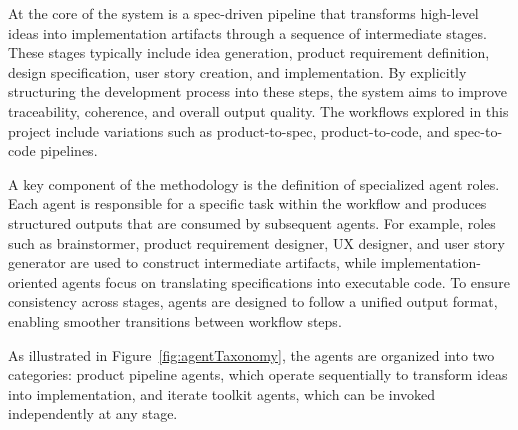 \documentclass[a4paper,12pt]{report}
\begin{document}
At the core of the system is a spec-driven pipeline that transforms high-level ideas into implementation artifacts through a sequence of intermediate stages. These stages typically include idea generation, product requirement definition, design specification, user story creation, and implementation. By explicitly structuring the development process into these steps, the system aims to improve traceability, coherence, and overall output quality. The workflows explored in this project include variations such as product-to-spec, product-to-code, and spec-to-code pipelines.

A key component of the methodology is the definition of specialized agent roles. Each agent is responsible for a specific task within the workflow and produces structured outputs that are consumed by subsequent agents. For example, roles such as brainstormer, product requirement designer, UX designer, and user story generator are used to construct intermediate artifacts, while implementation-oriented agents focus on translating specifications into executable code. To ensure consistency across stages, agents are designed to follow a unified output format, enabling smoother transitions between workflow steps.

As illustrated in Figure~\ref{fig:agentTaxonomy}, the agents are organized into two categories: product pipeline agents, which operate sequentially to transform ideas into implementation, and iterate toolkit agents, which can be invoked independently at any stage.
\end{document}
